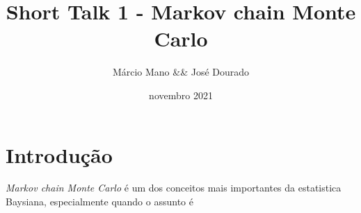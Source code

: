 \documentclass{article}
\title{Short Talk 1 - Markov chain Monte Carlo}
\author{Márcio Mano && José Dourado}
\date{novembro 2021}
\begin{document}
\maketitle

\section{Introdução}

\textit{Markov chain Monte Carlo} é um dos conceitos mais importantes da estatistica Baysiana, especialmente quando o assunto é 
\end{document}
